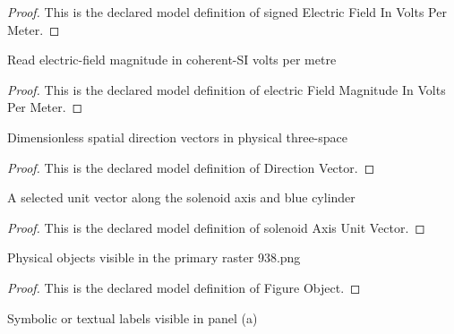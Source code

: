 \begin{proof}
  This is the declared model definition of signed Electric Field In Volts Per Meter.
\end{proof}
\begin{definition}
  \label{def:physics:phyx-mini-0938:phyxminiproblems-problemphyxmini0938-electricfieldmagnitudeinvoltspermeter}
  Read electric-field magnitude in coherent-SI volts per metre
\end{definition}
\begin{proof}
  This is the declared model definition of electric Field Magnitude In Volts Per Meter.
\end{proof}
\begin{definition}
  \label{def:physics:phyx-mini-0938:phyxminiproblems-problemphyxmini0938-directionvector}
  Dimensionless spatial direction vectors in physical three-space
\end{definition}
\begin{proof}
  This is the declared model definition of Direction Vector.
\end{proof}
\begin{definition}
  \label{def:physics:phyx-mini-0938:phyxminiproblems-problemphyxmini0938-solenoidaxisunitvector}
  A selected unit vector along the solenoid axis and blue cylinder
\end{definition}
\begin{proof}
  This is the declared model definition of solenoid Axis Unit Vector.
\end{proof}
\begin{definition}
  \label{def:physics:phyx-mini-0938:phyxminiproblems-problemphyxmini0938-figureobject}
  Physical objects visible in the primary raster 938.png
\end{definition}
\begin{proof}
  This is the declared model definition of Figure Object.
\end{proof}
\begin{definition}
  \label{def:physics:phyx-mini-0938:phyxminiproblems-problemphyxmini0938-figurelabel}
  Symbolic or textual labels visible in panel (a)
\end{definition}
